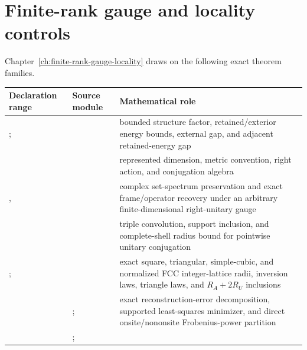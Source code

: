 \section{Finite-rank gauge and locality controls}

Chapter~\ref{ch:finite-rank-gauge-locality} draws on the following exact theorem families.

\begin{table}[ht]
\centering
\small
\begin{tabularx}{\textwidth}{@{}Z Y Y@{}}
\toprule
Declaration range & Source module & Mathematical role \\
\midrule
{}; 
  & 
  & bounded structure factor, retained/exterior energy bounds, external gap, and adjacent
    retained-energy gap \\
  & 
  & represented dimension, metric convention, right action, and conjugation algebra \\
, 
  & 
  & complex set-spectrum preservation and exact frame/operator recovery under an arbitrary
    finite-dimensional right-unitary gauge \\
  & 
  & triple convolution, support inclusion, and complete-shell radius bound for pointwise
    unitary conjugation \\
;
  & 
  & exact square, triangular, simple-cubic, and normalized FCC integer-lattice radii,
    inversion laws, triangle laws, and $R_A+2R_U$ inclusions \\
  & ;
  & exact reconstruction-error decomposition, supported least-squares minimizer, and
    direct onsite/nononsite Frobenius-power partition \\
  & ;

\end{tabularx}
\end{table}
